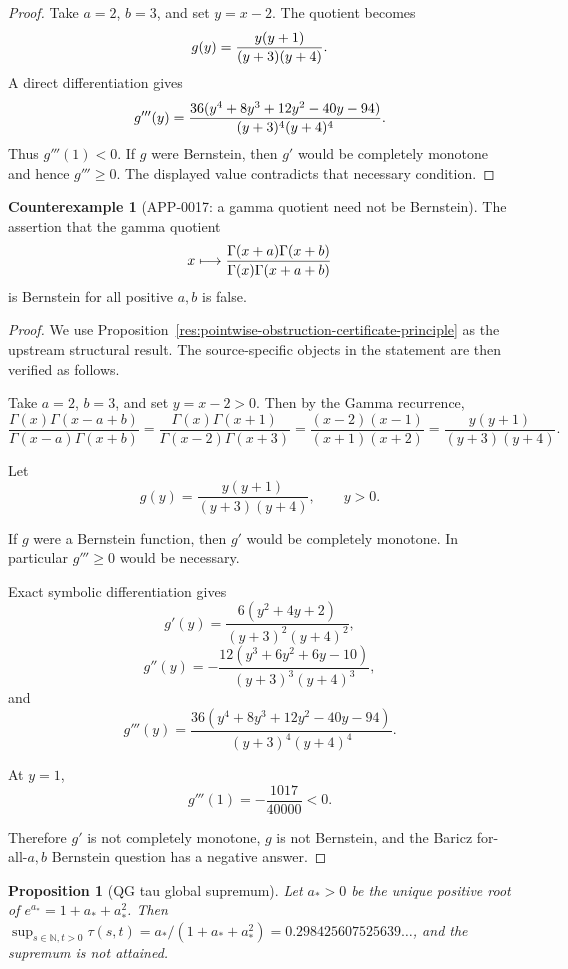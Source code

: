 \documentclass[11pt]{article}
\numberwithin{equation}{section}
\newtheorem{proposition}[theorem]{Proposition}
\theoremstyle{definition}
\newtheorem{counterexample}[theorem]{Counterexample}
\theoremstyle{remark}
\newcommand{\1}{\mathbf 1}
\begin{document}
\begin{proof}
Take \(a=2\), \(b=3\), and set \(y=x-2\).  The quotient becomes
\[
  g(y)={y(y+1)\over (y+3)(y+4)} .
\]
A direct differentiation gives
\[
  g'''(y)=
 {36(y^4+8y^3+12y^2-40y-94)\over (y+3)^4(y+4)^4}.
\]
Thus \(g'''(1)<0\).  If \(g\) were Bernstein, then \(g'\) would be completely
monotone and hence \(g'''\ge0\).  The displayed value contradicts that
necessary condition.
\end{proof}

\begin{counterexample}[APP-0017: a gamma quotient need not be Bernstein]
\label{thm:app17-baricz-counterexample}
The assertion that the gamma quotient
\[
 x\longmapsto {\Gamma(x+a)\Gamma(x+b)\over \Gamma(x)\Gamma(x+a+b)}
\]
is Bernstein for all positive \(a,b\) is false.


\end{counterexample}

\begin{proof}
We use Proposition~\ref{res:pointwise-obstruction-certificate-principle} as the upstream structural result. The source-specific objects in the statement are then verified as follows.

Take \(a=2\), \(b=3\), and set \(y=x-2>0\). Then by the Gamma recurrence,
\[
\frac{\Gamma(x)\Gamma(x-a+b)}{\Gamma(x-a)\Gamma(x+b)}
=\frac{\Gamma(x)\Gamma(x+1)}{\Gamma(x-2)\Gamma(x+3)}
=\frac{(x-2)(x-1)}{(x+1)(x+2)}
=\frac{y(y+1)}{(y+3)(y+4)}.
\]

Let
\[
g(y)=\frac{y(y+1)}{(y+3)(y+4)},\qquad y>0.
\]

If \(g\) were a Bernstein function, then \(g'\) would be completely monotone. In particular \(g'''\ge0\) would be necessary.

Exact symbolic differentiation gives
\[
g'(y)=\frac{6(y^2+4y+2)}{(y+3)^2(y+4)^2},
\]
\[
g''(y)=
-\frac{12(y^3+6y^2+6y-10)}{(y+3)^3(y+4)^3},
\]
and
\[
g'''(y)=
\frac{36(y^4+8y^3+12y^2-40y-94)}{(y+3)^4(y+4)^4}.
\]

At \(y=1\),
\[
g'''(1)=-\frac{1017}{40000}<0.
\]

Therefore \(g'\) is not completely monotone, \(g\) is not Bernstein, and the Baricz for-all-\(a,b\) Bernstein question has a negative answer.
\end{proof}

\begin{proposition}[QG tau global supremum]
\label{res:qg-tau-global-supremum}
Let \(a_*>0\) be the unique positive root of \(e^{a_*}=1+a_*+a_*^2\). Then \(\sup_{s\in\mathbb N,t>0}\tau(s,t)=a_*/(1+a_*+a_*^2)=0.298425607525639\ldots\), and the supremum is not attained.
\end{proposition}
\end{document}
